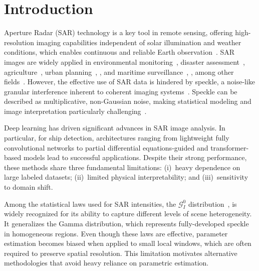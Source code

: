 \documentclass[
  lettersize  journal,
]{IEEEtran}%
\renewcommand*\tablename{Table}
\newcommand\tablename{Table}
\begin{document}
\newcommand{\cmark}{\textcolor{teal}{\ding{51}}}
\newcommand{\xmark}{\textcolor{orange}{\ding{55}}}
\renewcommand{\tablename}{TABLE}

\section{Introduction}\label{introduction}

 Aperture Radar (SAR) technology is a key tool
in remote sensing, offering high-resolution imaging capabilities
independent of solar illumination and weather conditions, which enables
continuous and reliable Earth
observation~. SAR images are widely
applied in environmental
monitoring~, disaster
assessment~,
agriculture~, urban
planning~,
,
and maritime surveillance~,
,
among other fields~. However, the
effective use of SAR data is hindered by speckle, a noise-like granular
interference inherent to coherent imaging
systems~. Speckle can be described
as multiplicative, non-Gaussian noise, making statistical modeling and
image interpretation particularly
challenging~.

Deep learning has driven significant advances in SAR image analysis. In
particular, for ship detection, architectures ranging from lightweight
fully convolutional networks
to partial differential equations-guided and transformer-based models
lead to successful applications. Despite their strong performance, these
methods share three fundamental limitations: (i)~heavy dependence on
large labeled datasets; (ii)~limited physical interpretability; and
(iii)~sensitivity to domain shift.

Among the statistical laws used for SAR intensities, the
\(\mathcal{G}_I^0\) distribution~,
 is widely recognized for its
ability to capture different levels of scene heterogeneity. It
generalizes the Gamma distribution, which represents fully-developed
speckle in homogeneous regions. Even though these laws are effective,
parameter estimation becomes biased when applied to small local windows,
which are often required to preserve spatial resolution. This limitation
motivates alternative methodologies that avoid heavy reliance on
parametric estimation.
\end{document}

